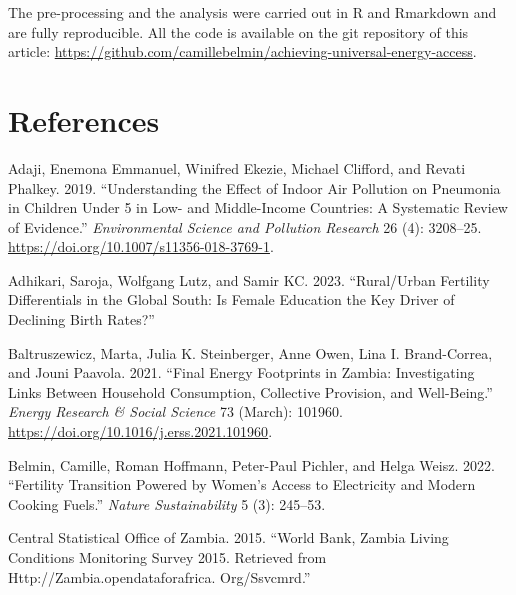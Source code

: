 \documentclass[
]{article}
\newlength{\cslhangindent}
\newlength{\cslentryspacingunit} %
\newenvironment{CSLReferences}[2] %
 {%
  \setlength{\parindent}{0pt}
  \ifodd #1
  \let\oldpar\par
  \def\par{\hangindent=\cslhangindent\oldpar}
  \fi
  \setlength{\parskip}{#2\cslentryspacingunit}
 }%
 {}
\begin{document}
The pre-processing and the analysis were carried out in R and Rmarkdown and are fully reproducible. All the code is available on the git repository of this article: \url{https://github.com/camillebelmin/achieving-universal-energy-access}.

\newpage

\hypertarget{references}{%
\section*{References}\label{references}}

\hypertarget{refs}{}
\begin{CSLReferences}{1}{0}
\leavevmode{}%
Adaji, Enemona Emmanuel, Winifred Ekezie, Michael Clifford, and Revati Phalkey. 2019. {``Understanding the Effect of Indoor Air Pollution on Pneumonia in Children Under 5 in Low- and Middle-Income Countries: A Systematic Review of Evidence.''} \emph{Environmental Science and Pollution Research} 26 (4): 3208--25. \url{https://doi.org/10.1007/s11356-018-3769-1}.

\leavevmode{}%
Adhikari, Saroja, Wolfgang Lutz, and Samir KC. 2023. {``Rural/Urban Fertility Differentials in the {Global} {South}: {Is} Female Education the Key Driver of Declining Birth Rates?''}

\leavevmode{}%
Baltruszewicz, Marta, Julia K. Steinberger, Anne Owen, Lina I. Brand-Correa, and Jouni Paavola. 2021. {``Final Energy Footprints in {Zambia}: {Investigating} Links Between Household Consumption, Collective Provision, and Well-Being.''} \emph{Energy Research \& Social Science} 73 (March): 101960. \url{https://doi.org/10.1016/j.erss.2021.101960}.

\leavevmode{}%
Belmin, Camille, Roman Hoffmann, Peter-Paul Pichler, and Helga Weisz. 2022. {``Fertility Transition Powered by Women's Access to Electricity and Modern Cooking Fuels.''} \emph{Nature Sustainability} 5 (3): 245--53.

\leavevmode{}%
Central Statistical Office of Zambia. 2015. {``World {Bank}, {Zambia} {Living} {Conditions} {Monitoring} {Survey} 2015. {Retrieved} from Http://Zambia.opendataforafrica. Org/Ssvcmrd.''}


\end{CSLReferences}
\end{document}
